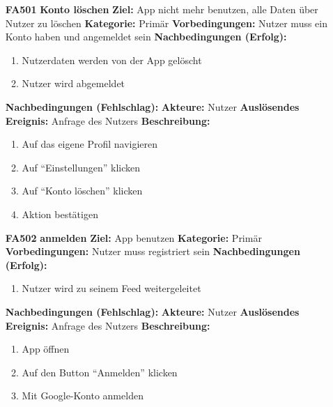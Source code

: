 \documentclass[parskip=full]{scrartcl}
\begin{document}
\begin{itemize}[nosep]
			\item[\textbf{FA501}]\textbf{Konto löschen}
			\newline \textbf{Ziel:} \gls{App} nicht mehr benutzen, alle Daten über Nutzer zu löschen
			\newline \textbf{Kategorie:} Primär
			\newline \textbf{Vorbedingungen:} Nutzer muss ein Konto haben und angemeldet sein
			\newline \textbf{Nachbedingungen (Erfolg):} 
			\begin{enumerate}[nosep]
				\item Nutzerdaten werden von der \gls{App} gelöscht
				\item Nutzer wird abgemeldet 
			\end{enumerate}
			\textbf{Nachbedingungen (Fehlschlag):}
			\newline \textbf{Akteure:} Nutzer
			\newline \textbf{Auslösendes Ereignis:} Anfrage des Nutzers
			\newline \textbf{Beschreibung:}
			\begin{enumerate}[nosep]
				\item Auf das eigene Profil navigieren
				\item Auf “Einstellungen” klicken
				\item Auf “Konto löschen” klicken
				\item Aktion bestätigen\\
			\end{enumerate}
			
			\item[\textbf{FA502}]\textbf{anmelden}
			\newline \textbf{Ziel:} \gls{App} benutzen
			\newline \textbf{Kategorie:} Primär
			\newline \textbf{Vorbedingungen:} Nutzer muss registriert sein
			\newline \textbf{Nachbedingungen (Erfolg):} 
			\begin{enumerate}[nosep]
				\item Nutzer wird zu seinem \gls{Feed} weitergeleitet 
			\end{enumerate}
			\textbf{Nachbedingungen (Fehlschlag):}
			\newline \textbf{Akteure:} Nutzer
			\newline \textbf{Auslösendes Ereignis:} Anfrage des Nutzers
			\newline \textbf{Beschreibung:}
			\begin{enumerate}[nosep]
				\item \gls{App} öffnen
				\item Auf den \gls{Button} “Anmelden” klicken
				\item Mit Google-Konto anmelden\\
			\end{enumerate}
			

\end{itemize}
\end{document}
